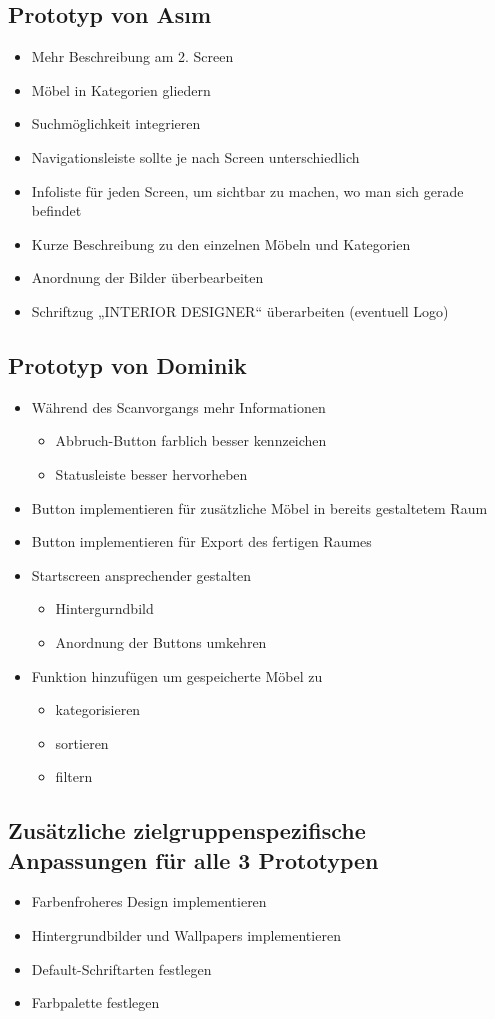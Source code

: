 \documentclass[12pt,paper=a4,oneside,hidelinks,headings=small,captions=heading,captions=nooneline]{scrartcl}
\begin{document}
\subsection{Prototyp von Asım}
\label{sec:orga0e1332}
\begin{itemize}
\item Mehr Beschreibung am 2. Screen
\item Möbel in Kategorien gliedern
\item Suchmöglichkeit integrieren
\item Navigationsleiste sollte je nach Screen unterschiedlich
\item Infoliste für jeden Screen, um sichtbar zu machen, wo man sich gerade befindet
\item Kurze Beschreibung zu den einzelnen Möbeln und Kategorien
\item Anordnung der Bilder überbearbeiten
\item Schriftzug „INTERIOR DESIGNER“ überarbeiten (eventuell Logo)
\end{itemize}
\subsection{Prototyp von Dominik}
\label{sec:orgd706e48}
\begin{itemize}
\item Während des Scanvorgangs mehr Informationen
\begin{itemize}
\item Abbruch-Button farblich besser kennzeichen
\item Statusleiste besser hervorheben
\end{itemize}
\item Button implementieren für zusätzliche Möbel in bereits gestaltetem Raum
\item Button implementieren für Export des fertigen Raumes
\item Startscreen ansprechender gestalten
\begin{itemize}
\item Hintergurndbild
\item Anordnung der Buttons umkehren
\end{itemize}
\item Funktion hinzufügen um gespeicherte Möbel zu
\begin{itemize}
\item kategorisieren
\item sortieren
\item filtern
\end{itemize}
\end{itemize}

\subsection{Zusätzliche zielgruppenspezifische Anpassungen für alle 3 Prototypen}
\label{sec:orgbed85f4}

\begin{itemize}
\item Farbenfroheres Design implementieren
\item Hintergrundbilder und Wallpapers implementieren
\item Default-Schriftarten festlegen
\item Farbpalette festlegen
\end{itemize}
\end{document}
